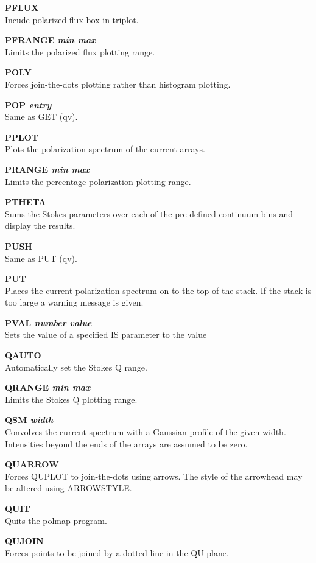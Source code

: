 \documentclass[11pt,nolof,noabs]{starlink}
\begin{document}
\textbf{PFLUX} \\
Incude polarized flux box in triplot.

\textbf{PFRANGE \it  min max } \\
Limits the polarized flux plotting range.

\textbf{POLY} \\
Forces join-the-dots plotting rather than histogram plotting.

\textbf{POP \it  entry} \\
Same as GET (qv).

\textbf{PPLOT} \\
Plots the polarization spectrum of the current arrays.

\textbf{PRANGE \it min max } \\
Limits the percentage polarization plotting range.

\textbf{PTHETA} \\
Sums the Stokes parameters over each of the pre-defined continuum bins and
display the results.

\textbf{PUSH} \\
Same as PUT (qv).

\textbf{PUT} \\
Places the current polarization spectrum on to the top of the stack. If the
stack is too large a warning message is given.

\textbf{PVAL \it number value} \\
Sets the value of a specified IS parameter to the value

\textbf{QAUTO} \\
Automatically set the Stokes Q range.

\textbf{QRANGE \it min max } \\
Limits the Stokes Q  plotting range.

\textbf{QSM \it width} \\
Convolves the current spectrum with a Gaussian profile of the given
width. Intensities beyond the ends of the arrays are assumed to be zero.

\textbf{QUARROW} \\
Forces QUPLOT to join-the-dots using arrows. The style of the
arrowhead may be altered using ARROWSTYLE.

\textbf{QUIT} \\
Quits the  polmap program.

\textbf{QUJOIN} \\
Forces points to be joined by a dotted line in the QU plane.
\end{document}
